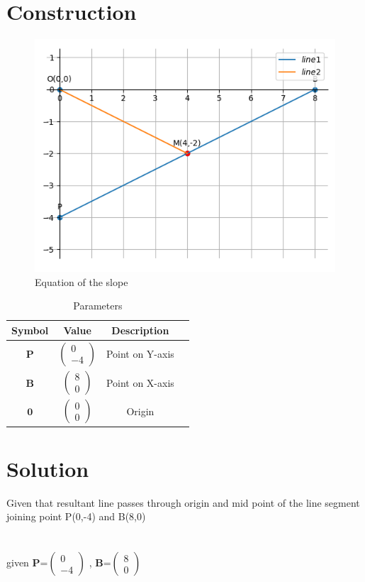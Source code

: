 \documentclass[journal,12pt,twocolumn]{IEEEtran}
\newcommand{\myvec}[1]{\ensuremath{\begin{pmatrix}#1\end{pmatrix}}}
\let\vec\mathbf
\begin{document}
\section{Construction}
\begin{figure}[h]
    \centering
\includegraphics[width=\columnwidth]{line.png}
    \caption{Equation of the slope}
    \label{fig:my_label}
\end{figure}
\vspace{2cm}
\begin{table}[h]
    \centering
    \begin{tabular}{|c|c|c|c|}
       \hline
       \textbf{Symbol}&\textbf{Value}&\textbf{Description}  \\
       \hline
	    $\vec{P}$ & $\myvec{
		    0\\
		    -4}$
	    & Point on Y-axis\\
        \hline
	    $\vec{B}$ & $\myvec{8\\0}$
 & Point on X-axis\\
        \hline
	    $\vec{0}$ & $\myvec{0\\0}$
 & Origin\\
        \hline
    \end{tabular}
    \caption{Parameters}
    \label{tab:my_label}
\end{table}


\section{Solution}
Given that resultant line passes through origin and mid point of the line segment joining point P(0,-4) and B(8,0) \\
\\
\\
given ${\vec{P}}$=$\myvec{
  0\\
  -4}$
 , ${\vec{B}}$=$\myvec{
  8\\
  0}$
  
\end{document}
